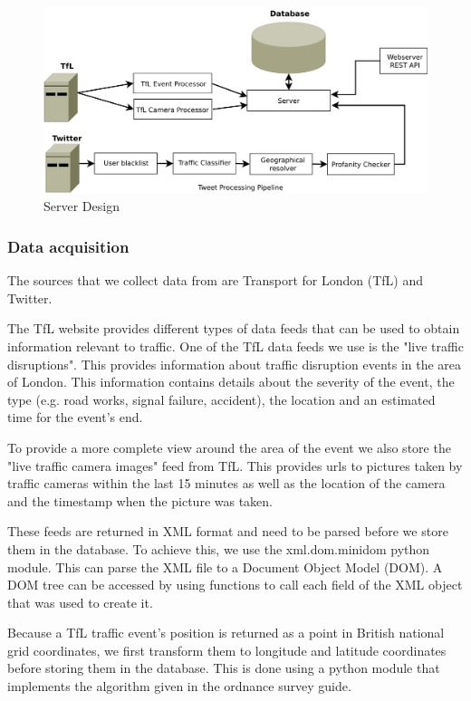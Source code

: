 \begin{figure}[htb]
\centering
\includegraphics[width=1\textwidth]{images/design/server/server.pdf}
\caption{Server Design}
\label{fig:server_design}
\end{figure}

\subsubsection{Data acquisition}
The sources that we collect data from are Transport for London (TfL) and Twitter.

The TfL website provides different types of data feeds that can be used to obtain information relevant to traffic. 
One of the TfL data feeds we use is the "live traffic disruptions". This provides information about traffic disruption events in the area of London. This information contains details about the severity of the event, the type (e.g. road works, signal failure, accident), the location and an estimated time for the event's end.

To provide a more complete view around the area of the event we also store the "live traffic camera images" feed from TfL. This provides urls to pictures taken by traffic cameras within the last 15 minutes as well as the location of the camera and the timestamp when the picture was taken.

These feeds are returned in XML format and need to be parsed before we store them in the database. To achieve this, we use the xml.dom.minidom python module. This can parse the XML file to a Document Object Model (DOM). A DOM tree can be accessed by using functions to call each field of the XML object that was used to create it.

Because a TfL traffic event's position is returned as a point in British national grid coordinates, we first transform them to longitude and latitude coordinates before storing them in the database. This is done using a python module that implements the algorithm given in the ordnance survey guide.\cite{grid2lonlat_alg} \cite{grid2lonlat_impl}

